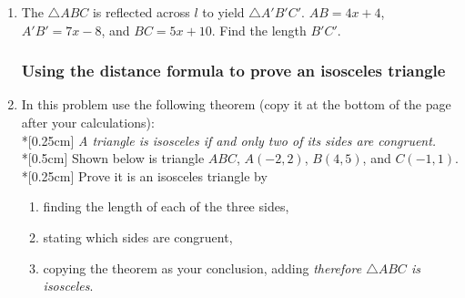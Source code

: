 \documentclass[12pt, twoside]{article}
\begin{document}
\begin{enumerate}
  \item The $\triangle ABC$ is reflected across $l$ to yield $\triangle A'B'C'$. $AB=4x+4$, $A'B'=7x-8$, and $BC=5x+10$. Find the length $B'C'$. %
    \begin{flushright}
  \end{flushright}

\newpage
  \subsubsection*{Using the distance formula to prove an isosceles triangle}
    \item In this problem use the following theorem (copy it at the bottom of the page after your calculations): \\*[0.25cm]
    \emph{A triangle is isosceles if and only two of its sides are congruent.}\\*[0.5cm]
    Shown below is triangle $ABC$, $A(-2,2)$, $B(4,5)$, and $C(-1,1)$. \\*[0.25cm]
    Prove it is an isosceles triangle by
    \begin{enumerate}
      \item finding the length of each of the three sides,
      \item stating which sides are congruent,
      \item copying the theorem as your conclusion, adding \emph{therefore $\triangle ABC$ is isosceles}.
    \end{enumerate}
    \begin{flushright} %
    \end{flushright}


\end{enumerate}
\end{document}
